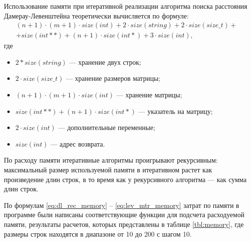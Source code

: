Использование памяти при итеративной реализации алгоритма поиска расстояния Дамерау-Левенштейна теоретически вычисляется по формуле:
\begin{equation}
	\label{eq:dl_mtr_memory}
	\begin{aligned}
		(n + 1) \cdot (m + 1) \cdot size(int) + 2 \cdot size(string) + 2 \cdot size(size\_t) + \\
		+ size(int **) + (n + 1) \cdot size(int *) + 3 \cdot size(int),
	\end{aligned}
\end{equation}
где
\begin{itemize}
	\item $2 * size(string)$ --- хранение двух строк;
	\item $2 \cdot size(size\_t)$ --- хранение размеров матрицы;
	\item $(n + 1) \cdot (m + 1) \cdot size(int)$ --- хранение матрицы;
	\item $size(int **) + (n + 1) \cdot size(int *)$ --- указатель на матрицу;
	\item $2 \cdot size(int)$ --- дополнительные переменные;
	\item $size(int)$ --- адрес возврата.
\end{itemize}

По расходу памяти итеративные алгоритмы проигрывают рекурсивным: максимальный размер используемой памяти в итеративном растет как произведение длин строк, в то время как у рекурсивного алгоритма — как сумма длин строк.

По формулам \ref{eq:dl_rec_memory} -- \ref{eq:lev_mtr_memory} затрат по памяти в программе были написаны соответствующие функции для подсчета расходуемой памяти, результаты расчетов, которых представлены в таблице \ref{tbl:memory}, где размеры строк находятся в диапазоне от 10 до 200 с шагом 10.

